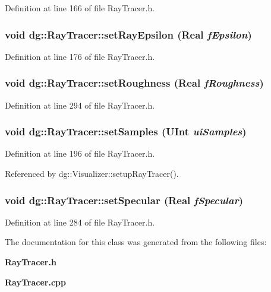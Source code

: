 Definition at line 166 of file Ray\-Tracer.h.
\subsubsection{\setlength{\rightskip}{0pt plus 5cm}void dg::Ray\-Tracer::set\-Ray\-Epsilon ({\bf Real} {\em f\-Epsilon})\hspace{0.3cm}{\tt  [inline]}}\label{classdg_1_1RayTracer_a11}




Definition at line 176 of file Ray\-Tracer.h.
\subsubsection{\setlength{\rightskip}{0pt plus 5cm}void dg::Ray\-Tracer::set\-Roughness ({\bf Real} {\em f\-Roughness})\hspace{0.3cm}{\tt  [inline]}}\label{classdg_1_1RayTracer_a29}




Definition at line 294 of file Ray\-Tracer.h.
\subsubsection{\setlength{\rightskip}{0pt plus 5cm}void dg::Ray\-Tracer::set\-Samples ({\bf UInt} {\em ui\-Samples})\hspace{0.3cm}{\tt  [inline]}}\label{classdg_1_1RayTracer_a15}




Definition at line 196 of file Ray\-Tracer.h.

Referenced by dg::Visualizer::setup\-Ray\-Tracer().
\subsubsection{\setlength{\rightskip}{0pt plus 5cm}void dg::Ray\-Tracer::set\-Specular ({\bf Real} {\em f\-Specular})\hspace{0.3cm}{\tt  [inline]}}\label{classdg_1_1RayTracer_a27}




Definition at line 284 of file Ray\-Tracer.h.

The documentation for this class was generated from the following files:\begin{CompactItemize}
\item 
{\bf Ray\-Tracer.h}\item 
{\bf Ray\-Tracer.cpp}\end{CompactItemize}

